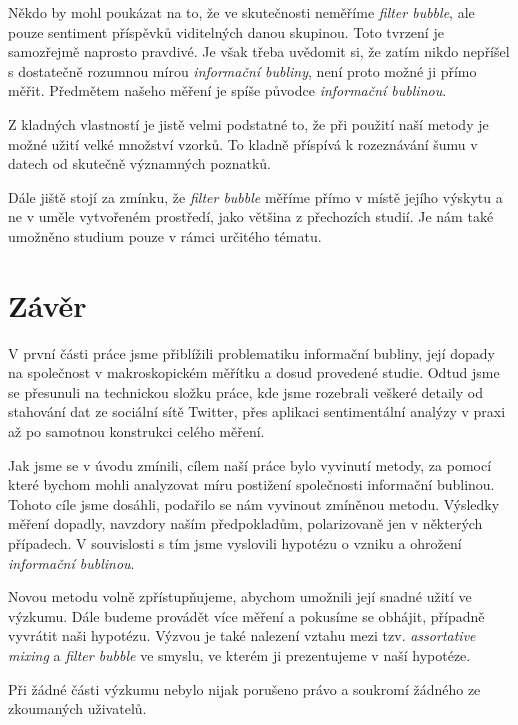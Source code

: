 \documentclass[12pt, a4paper]{article}
\numberwithin{equation}{section} 	%
\begin{document}
Někdo by mohl poukázat na to, že ve skutečnosti neměříme \textit{filter bubble}, ale pouze sentiment příspěvků viditelných danou skupinou. Toto tvrzení je samozřejmě naprosto pravdivé. Je však třeba uvědomit si, že zatím nikdo nepříšel s dostatečně rozumnou mírou \textit{informační bubliny}, není proto možné ji přímo měřit. Předmětem našeho měření je spíše původce \textit{informační bublinou}.

Z kladných vlastností je jistě velmi podstatné to, že při použití naší metody je možné užití velké množství vzorků. To kladně příspívá k rozeznávání šumu v datech od skutečně významných poznatků.

Dále jiště stojí za zmínku, že \textit{filter bubble} měříme přímo v místě jejího výskytu a ne v uměle vytvořeném prostředí, jako většina z přechozích studií. Je nám také umožněno studium pouze v rámci určitého tématu.

\newpage
\section{Závěr}
\noindent V první části práce jsme přiblížili problematiku informační bubliny, její dopady na společnost v makroskopickém měřítku a dosud provedené studie.  Odtud jsme se přesunuli na technickou složku práce, kde jsme rozebrali veškeré detaily od stahování dat ze sociální sítě Twitter, přes aplikaci sentimentální analýzy v praxi až po samotnou konstrukci celého měření.

Jak jsme se v úvodu zmínili, cílem naší práce bylo vyvinutí metody, za pomocí které bychom mohli analyzovat míru postižení společnosti informační bublinou. Tohoto cíle jsme dosáhli, podařilo se nám vyvinout zmíněnou metodu. Výsledky měření dopadly, navzdory naším předpokladům, polarizovaně jen v některých případech. V souvislosti s tím jsme vyslovili hypotézu o vzniku a ohrožení \textit{informační bublinou}.

Novou metodu volně zpřístupňujeme, abychom umožnili její snadné užití ve výzkumu. Dále budeme provádět více měření a pokusíme se obhájit, případně vyvrátit naši hypotézu. Výzvou je také nalezení vztahu mezi tzv. \textit{assortative mixing} a \textit{filter bubble} ve smyslu, ve kterém ji prezentujeme v naší hypotéze.

Při žádné části výzkumu nebylo nijak porušeno právo a soukromí žádného ze zkoumaných uživatelů.
\end{document}
